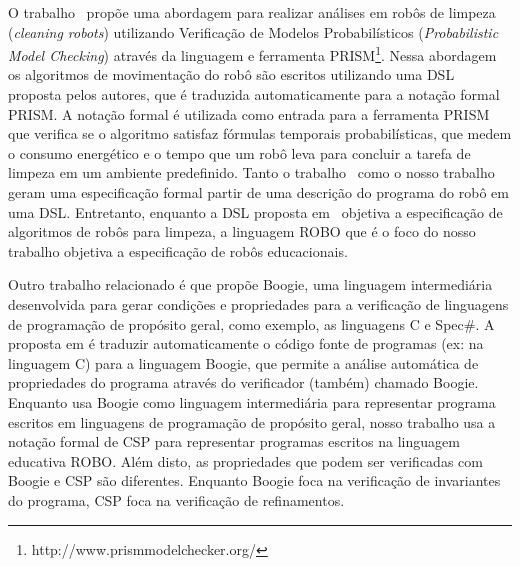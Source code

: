 O trabalho~\cite{araujomotanogueira} propõe uma abordagem para realizar análises em robôs de limpeza (\textit{cleaning robots}) utilizando Verificação de Modelos Probabilísticos (\textit{Probabilistic Model Checking}) através da linguagem e ferramenta PRISM\footnote[13]{http://www.prismmodelchecker.org/}. Nessa abordagem os algoritmos de movimentação do robô são escritos utilizando uma DSL proposta pelos autores, que é traduzida automaticamente para a notação formal PRISM. A notação formal é utilizada como entrada para a ferramenta PRISM que verifica se o algoritmo satisfaz fórmulas temporais probabilísticas, que medem o consumo energético e o tempo que um robô leva para concluir a tarefa de limpeza em um ambiente predefinido. 
Tanto o trabalho~\cite{araujomotanogueira} como o nosso trabalho geram uma especificação formal partir de uma descrição do programa do robô em uma DSL. Entretanto, enquanto a DSL proposta em~\cite{araujomotanogueira} objetiva a especificação de algoritmos de robôs para limpeza, a linguagem ROBO que é o foco do nosso trabalho objetiva a especificação de robôs educacionais. 

Outro trabalho relacionado é \cite{this-is-boogie-2-2} que propõe Boogie, uma linguagem intermediária desenvolvida para gerar condições e propriedades para a verificação de linguagens de programação de propósito geral, como exemplo, as linguagens C e Spec\#. A proposta em \cite{this-is-boogie-2-2} é traduzir automaticamente o código fonte de programas (ex: na linguagem C) para a linguagem Boogie, que permite a análise automática de propriedades do programa através do verificador (também) chamado Boogie. Enquanto \cite{this-is-boogie-2-2} usa Boogie como linguagem intermediária para representar programa escritos em linguagens de programação de propósito geral, nosso trabalho usa a notação formal de CSP para representar programas escritos na linguagem educativa ROBO. Além disto, as propriedades que podem ser verificadas com Boogie e CSP são diferentes. Enquanto Boogie foca na verificação de invariantes do programa, CSP foca na verificação de refinamentos. 

